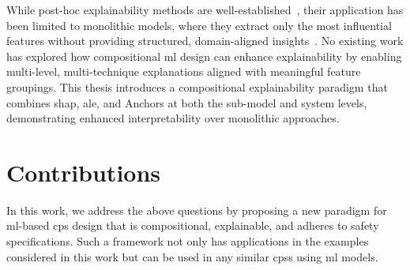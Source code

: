 \begin{questions}
While post-hoc explainability methods are well-established~\cite{lundberg_unified_2017, apley_visualizing_2019, ribeiro_anchors_2018}, their application has been limited to monolithic models, where they extract only the most influential features without providing structured, domain-aligned insights~\cite{byeon_advances_2023}. No existing work has explored how compositional \gls{ml} design can enhance explainability by enabling multi-level, multi-technique explanations aligned with meaningful feature groupings. This thesis introduces a compositional explainability paradigm that combines \gls{shap}, \gls{ale}, and Anchors at both the sub-model and system levels, demonstrating enhanced interpretability over monolithic approaches.

\end{questions}


\section{Contributions}

In this work, we address the above questions by proposing a new paradigm for \gls{ml}-based \gls{cps} design that is compositional, explainable, and adheres to safety specifications. Such a framework not only has applications in the examples considered in this work but can be used in any similar \glspl{cps} using \gls{ml} models.

